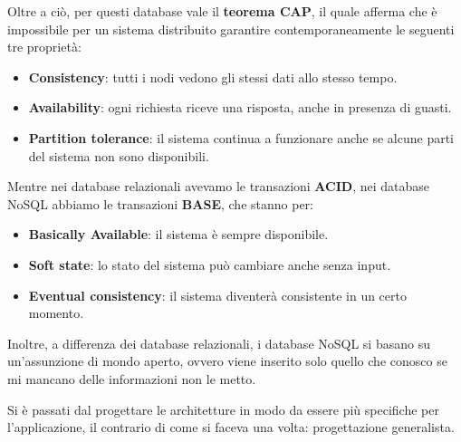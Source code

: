 Oltre a ciò, per questi database vale il \textbf{teorema CAP}, il quale afferma
che è impossibile per un sistema distribuito garantire contemporaneamente le
seguenti tre proprietà:
\begin{itemize}
      \item \textbf{Consistency}: tutti i nodi vedono gli stessi dati allo stesso
            tempo.
      \item \textbf{Availability}: ogni richiesta riceve una risposta, anche in
            presenza di guasti.
      \item \textbf{Partition tolerance}: il sistema continua a funzionare anche
            se alcune parti del sistema non sono disponibili.
\end{itemize}
Mentre nei database relazionali avevamo le transazioni \textbf{ACID}, nei database
NoSQL abbiamo le transazioni \textbf{BASE}, che stanno per:
\begin{itemize}
      \item \textbf{Basically Available}: il sistema è sempre disponibile.
      \item \textbf{Soft state}: lo stato del sistema può cambiare anche senza
            input.
      \item \textbf{Eventual consistency}: il sistema diventerà consistente in un
            certo momento.
\end{itemize}
Inoltre, a differenza dei database relazionali, i database NoSQL si basano su
un'assunzione di mondo aperto, ovvero viene inserito solo quello che conosco se
mi mancano delle informazioni non le metto.

Si è passati dal progettare le architetture in modo da essere più specifiche
per l'applicazione, il contrario di come si faceva una volta: progettazione generalista.

